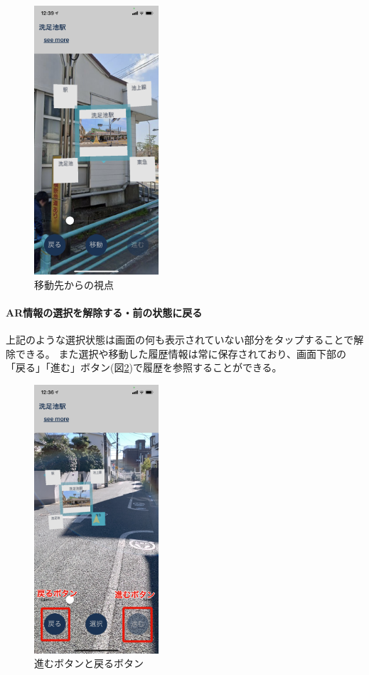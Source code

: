 \begin{figure}[H]
  \centering
  \includegraphics[height=100mm]{images/hypar_touch_moved.png}
  \caption{移動先からの視点} \label{fig:hypar_touch_moved}
\end{figure}

\paragraph*{AR情報の選択を解除する・前の状態に戻る}
上記のような選択状態は画面の何も表示されていない部分をタップすることで解除できる。
また選択や移動した履歴情報は常に保存されており、画面下部の「戻る」「進む」ボタン(図\ref{fig:hypar_touch_history_button})で履歴を参照することができる。

\begin{figure}[H]
  \centering
  \includegraphics[height=100mm]{images/hypar_touch_history_button.png}
  \caption{進むボタンと戻るボタン} \label{fig:hypar_touch_history_button}
\end{figure}

